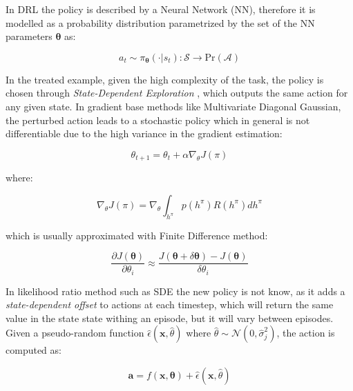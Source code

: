 In \ac{DRL} the policy is described by a Neural Network (\ac{NN}), therefore it is modelled as a probability distribution parametrized by the set of the \ac{NN} parameters $\boldsymbol{\theta}$ as:

\begin{equation}
    a _t \sim \pi _{\boldsymbol{\theta}}(\cdot | s_t): \mathcal{S} \rightarrow \mathrm{Pr}(\mathcal{A})
\end{equation}

In the treated example, given the high complexity of the task, the policy is chosen through \textit{State-Dependent Exploration} \cite{daelemans_state-dependent_2008} \cite{raffin_smooth_2021}, which outputs the same action for any given state. In gradient base methods like Multivariate Diagonal Gaussian, the perturbed action leads to a stochastic policy which in general is not differentiable due to the high variance in the gradient estimation:

\begin{equation}
    \theta _{t+1} = \theta _t + \alpha \nabla _{\theta} J(\pi)
\end{equation}

where:

\begin{equation}
    \nabla _{\theta} J(\pi) = \nabla _{\theta} \int _{h ^{\pi}} p(h ^{\pi})R(h ^{\pi})dh ^{\pi}
\end{equation}

which is usually approximated with Finite Difference method:

\begin{equation}
    \label{eqn:finitediff}
    \frac{\partial J(\boldsymbol{\theta})}{\partial \theta _i} \approx \frac{J(\boldsymbol{\theta} + \delta \boldsymbol{\theta}) - J(\boldsymbol{\theta})}{\delta \theta _i}
\end{equation}

In likelihood ratio method such as \ac{SDE} the new policy is not know, as it adds a \textit{state-dependent offset} to actions at each timestep, which will return the same value in the state state withing an episode, but it will vary between episodes. Given a pseudo-random function $\hat{\epsilon}(\mathbf{x}, \hat{\theta})$ where $\hat{\theta} \sim \mathcal{N}(0, \hat{\sigma} _j ^2)$, the action is computed as:

\begin{equation}
    \mathbf{a} = f(\mathbf{x}, \boldsymbol{\theta}) + \hat{\epsilon}(\mathbf{x}, \hat{\theta})
\end{equation}


